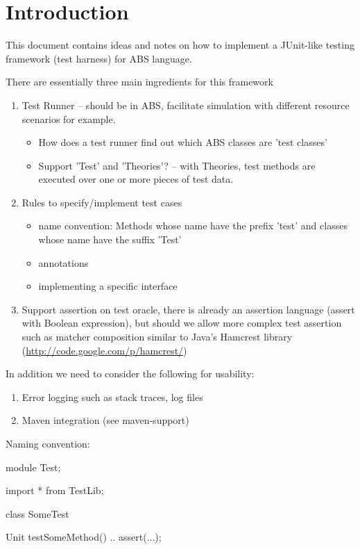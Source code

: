 \documentclass[a4paper,11pt,final]{article}
\title{\deliverableTitle}
\author{Peter Y. H. Wong}
\begin{document}
\maketitle 

\section{Introduction}
This document contains ideas and notes on how to implement a JUnit-like testing
framework (test harness) for ABS language.

There are essentially three main ingredients for this framework
\begin{enumerate}
  \item Test Runner -- should be in ABS, facilitate simulation with different
  resource scenarios for example.
  \begin{itemize}
    \item How does a test runner find out which ABS classes are 'test classes' 
    \item Support 'Test' and 'Theories'? -- with Theories, test methods are
    executed over one or more pieces of test data.
  \end{itemize}
  \item Rules to specify/implement test cases
  \begin{itemize}
    \item name convention: Methods whose name have the prefix 'test' and classes whose name have the suffix 'Test'
    \item annotations 
    \item implementing a specific interface
  \end{itemize}
  \item Support assertion on test oracle, there is already an assertion language
  (assert with Boolean expression), but should we allow more complex test
  assertion such as matcher composition similar to Java's Hamcrest library
  (\url{http://code.google.com/p/hamcrest/})
\end{enumerate}

In addition we need to consider the following for usability:
\begin{enumerate}
  \item Error logging such as stack traces, log files
  \item Maven integration (see maven-support)
\end{enumerate}

\noindent Naming convention:
\begin{absexamplen}
module Test;

import * from TestLib;

class SomeTest {

  Unit testSomeMethod() {
  	 ..
  	 assert(...);
  }
}
\end{absexamplen}
\end{document}
